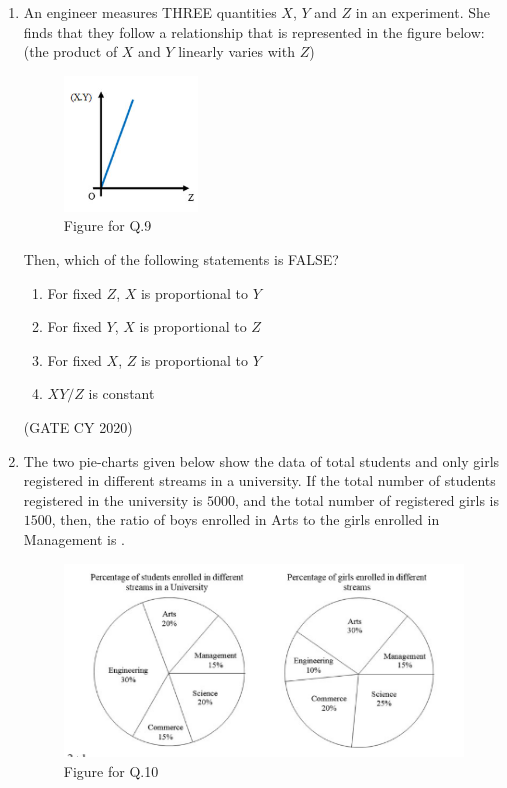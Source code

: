 \documentclass[12pt]{article}
\begin{document}
\begin{enumerate}
\item An engineer measures THREE quantities $X$, $Y$ and $Z$ in an experiment. She finds that they follow a relationship that is represented in the figure below: (the product of $X$ and $Y$ linearly varies with $Z$)

\begin{figure}[H]
\centering
\includegraphics[width=0.4\columnwidth]{figs/q9.png}
\caption{Figure for Q.9}
\label{fig:q9}
\end{figure}

Then, which of the following statements is FALSE?
\begin{enumerate}
\item For fixed $Z$, $X$ is proportional to $Y$
\item For fixed $Y$, $X$ is proportional to $Z$
\item For fixed $X$, $Z$ is proportional to $Y$
\item $XY/Z$ is constant
\end{enumerate}
\hfill (GATE CY 2020)

\item The two pie-charts given below show the data of total students and only girls registered in different streams in a university. If the total number of students registered in the university is $5000$, and the total number of registered girls is $1500$, then, the ratio of boys enrolled in Arts to the girls enrolled in Management is \underline{\hspace{1cm}}.

\begin{figure}[H]
\centering
\includegraphics[width=0.6\columnwidth]{figs/q10.png}
\caption{Figure for Q.10}
\label{fig:q10}
\end{figure}


\end{enumerate}
\end{document}

